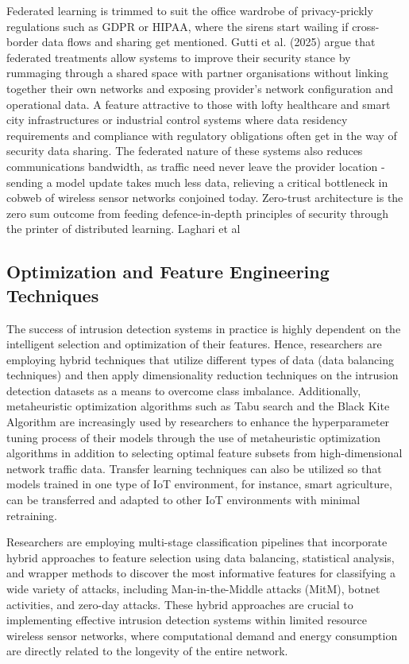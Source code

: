 \documentclass[12pt]{article}
\begin{document}
Federated learning is trimmed to suit the office wardrobe of privacy-prickly regulations such as GDPR or HIPAA, where the sirens start wailing if cross-border data flows and sharing get mentioned. Gutti et al. (2025) argue that federated treatments allow systems to improve their security stance by rummaging through a shared space with partner organisations without linking together their own networks and exposing provider’s network configuration and operational data. A feature attractive to those with lofty healthcare and smart city infrastructures or industrial control systems where data residency requirements and compliance with regulatory obligations often get in the way of security data sharing. The federated nature of these systems also reduces communications bandwidth, as traffic need never leave the provider location - sending a model update takes much less data, relieving a critical bottleneck in cobweb of wireless sensor networks conjoined today. Zero-trust architecture is the zero sum outcome from feeding defence-in-depth principles of security through the printer of distributed learning. Laghari et al


\subsection{Optimization and Feature Engineering Techniques}
The success of intrusion detection systems in practice is highly dependent on the intelligent selection and optimization of their features. Hence, researchers are employing hybrid techniques that utilize different types of data (data balancing techniques) and then apply dimensionality reduction techniques on the intrusion detection datasets as a means to overcome class imbalance. Additionally, metaheuristic optimization algorithms such as Tabu search and the Black Kite Algorithm are increasingly used by researchers to enhance the hyperparameter tuning process of their models through the use of metaheuristic optimization algorithms in addition to selecting optimal feature subsets from high-dimensional network traffic data. Transfer learning techniques can also be utilized so that models trained in one type of IoT environment, for instance, smart agriculture, can be transferred and adapted to other IoT environments with minimal retraining.



Researchers are employing multi-stage classification pipelines that incorporate hybrid approaches to feature selection using data balancing, statistical analysis, and wrapper methods to discover the most informative features for classifying a wide variety of attacks, including Man-in-the-Middle attacks (MitM), botnet activities, and zero-day attacks. These hybrid approaches are crucial to implementing effective intrusion detection systems within limited resource wireless sensor networks, where computational demand and energy consumption are directly related to the longevity of the entire network.
\end{document}
